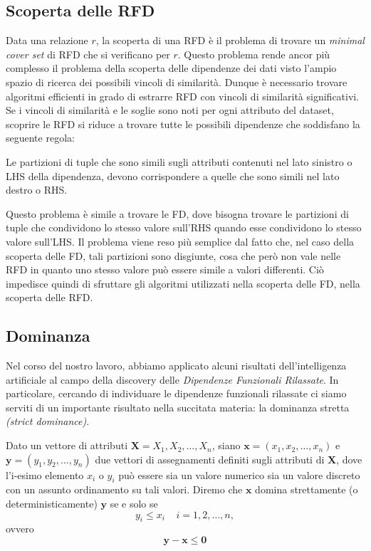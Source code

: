 \subsection{Scoperta delle RFD}
Data una relazione $r$, la scoperta di una RFD è il problema di trovare un \textit{minimal cover set} di RFD che si verificano per $r$. Questo problema rende ancor più complesso il problema della scoperta delle dipendenze dei dati visto l'ampio spazio di ricerca dei possibili vincoli di similarità. Dunque è necessario trovare algoritmi efficienti in grado di estrarre RFD con vincoli di similarità significativi.\\
Se i vincoli di similarità e le soglie sono noti per ogni attributo del dataset, scoprire le RFD si riduce a trovare tutte le possibili dipendenze che soddisfano la seguente regola:
\begin{lemma}
	Le partizioni di tuple che sono simili sugli attributi contenuti nel lato sinistro o LHS della dipendenza, devono corrispondere a quelle che sono simili nel lato destro o RHS.
\end{lemma}
Questo problema è simile a trovare le FD, dove bisogna trovare le partizioni di tuple che condividono lo stesso valore sull'RHS quando esse condividono lo stesso valore sull'LHS. Il problema viene reso più semplice dal fatto che, nel caso della scoperta delle FD, tali partizioni sono disgiunte, cosa che però non vale nelle RFD in quanto uno stesso valore può essere simile a valori differenti. Ciò impedisce quindi di sfruttare gli algoritmi utilizzati nella scoperta delle FD, nella scoperta delle RFD.

\subsection{Dominanza}
Nel corso del nostro lavoro, abbiamo applicato alcuni risultati dell'intelligenza artificiale al campo della discovery delle \textit{Dipendenze Funzionali Rilassate}. In particolare, cercando di individuare le dipendenze funzionali rilassate ci siamo serviti di un importante risultato nella succitata materia: la dominanza stretta \textit{(strict dominance)}.
\begin{theorem}
	\label{defDom}
	Dato un vettore di attributi $\mathbf{X} = X_1, X_2, \ldots, X_n $, siano $\mathbf{x} = (x_1, x_2, \ldots, x_n)$ e $\mathbf{y} = (y_1, y_2, \ldots , y_n)$ due vettori di assegnamenti definiti sugli attributi di $\mathbf{X}$, dove l'i-esimo elemento $x_i$ o $y_i$ può essere sia un valore numerico sia un valore discreto con un assunto ordinamento su tali valori. Diremo che $\mathbf{x}$ domina strettamente (o deterministicamente) $\mathbf{y}$ se e solo se $$y_i \leq x_i\;\;\;\;i = 1,2,\ldots,n,$$ ovvero $$\mathbf{y} - \mathbf{x} \leq \mathbf{0}$$
\end{theorem}
